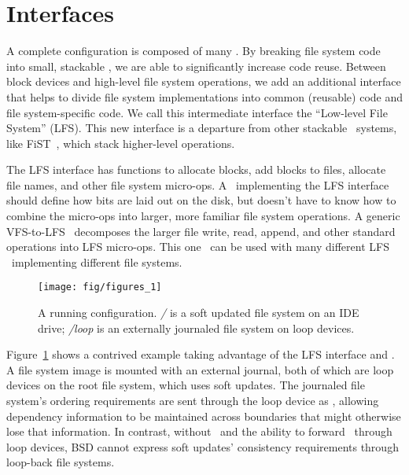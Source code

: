 \section {\Module Interfaces}
\label{sec:interfaces}

A complete \Kudos configuration is composed of many \modules. By breaking file
system code into small, stackable \modules, we are able to significantly
increase code reuse. Between block devices and high-level file system
operations, we add an additional interface that helps to divide file system
implementations into common (reusable) code and file system-specific code. We
call this intermediate interface the ``Low-level File System'' (LFS). This new
interface is a departure from other stackable \module\ systems, like
FiST~\cite{zadok00fist}, which stack higher-level operations.

The LFS interface has functions to allocate blocks, add blocks to files,
allocate file names, and other file system micro-ops. A \module\ implementing
the LFS interface should define how bits are laid out on the disk, but doesn't
have to know how to combine the micro-ops into larger, more familiar file system
operations. A generic VFS-to-LFS \module\ decomposes the larger file write,
read, append, and other standard operations into LFS micro-ops. This one
\module\ can be used with many different LFS \modules\ implementing different
file systems.

\begin{figure}[tb]
  \centering
  \texttt{[image: fig/figures\_1]}
  \caption{A running \Kudos configuration. {\it/} is a soft updated
    file system on an IDE drive; {\it/loop} is an externally journaled
    file system on loop devices.}
  \label{fig:kfs-graph}
\end{figure}

Figure~\ref{fig:kfs-graph} shows a contrived example taking advantage of the LFS
interface and \chdescs. A file system image is mounted with an external journal,
both of which are loop devices on the root file system, which uses soft updates.
The journaled file system's ordering requirements are sent through the loop
device as \chdescs, allowing dependency information to be maintained across
boundaries that might otherwise lose that information. In contrast, without
\chdescs\ and the ability to forward \chdescs\ through loop devices, BSD cannot
express soft updates' consistency requirements through loop-back file systems.
